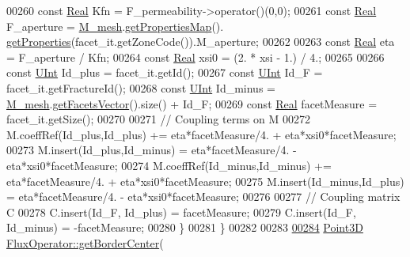 \begin{DoxyCode}
00260         \textcolor{keyword}{const} \hyperlink{namespaceFVCode3D_a40c1f5588a248569d80aa5f867080e83}{Real} Kfn = F\_permeability->operator()(0,0);
00261         \textcolor{keyword}{const} \hyperlink{namespaceFVCode3D_a40c1f5588a248569d80aa5f867080e83}{Real} F\_aperture = \hyperlink{classFVCode3D_1_1global__Operator_a027911d0f801f6f19a3006329ec30a7f}{M\_mesh}.\hyperlink{classFVCode3D_1_1Rigid__Mesh_ab6e52fa6193e5db83fe7ccbb1c3737e8}{getPropertiesMap}().
      \hyperlink{classFVCode3D_1_1PropertiesMap_ace888d15c9a4ab13d5e217a3a565604c}{getProperties}(facet\_it.getZoneCode()).M\_aperture;
00262         
00263                 \textcolor{keyword}{const} \hyperlink{namespaceFVCode3D_a40c1f5588a248569d80aa5f867080e83}{Real} eta          = F\_aperture / Kfn;
00264                 \textcolor{keyword}{const} \hyperlink{namespaceFVCode3D_a40c1f5588a248569d80aa5f867080e83}{Real} xsi0     =  (2. * xsi - 1.) / 4.;
00265                 
00266                 \textcolor{keyword}{const} \hyperlink{namespaceFVCode3D_a4bf7e328c75d0fd504050d040ebe9eda}{UInt} Id\_plus         = facet\_it.getId();
00267                 \textcolor{keyword}{const} \hyperlink{namespaceFVCode3D_a4bf7e328c75d0fd504050d040ebe9eda}{UInt} Id\_F            = facet\_it.getFractureId();
00268                 \textcolor{keyword}{const} \hyperlink{namespaceFVCode3D_a4bf7e328c75d0fd504050d040ebe9eda}{UInt} Id\_minus        = \hyperlink{classFVCode3D_1_1global__Operator_a027911d0f801f6f19a3006329ec30a7f}{M\_mesh}.\hyperlink{classFVCode3D_1_1Rigid__Mesh_a6d3cdd4ef8a5225599953179d5302636}{getFacetsVector}().size() + 
      Id\_F;
00269                 \textcolor{keyword}{const} \hyperlink{namespaceFVCode3D_a40c1f5588a248569d80aa5f867080e83}{Real} facetMeasure    = facet\_it.getSize();
00270                 
00271                 \textcolor{comment}{// Coupling terms on M}
00272                 M.coeffRef(Id\_plus,Id\_plus)    +=   eta*facetMeasure/4. + eta*xsi0*facetMeasure;
00273                 M.insert(Id\_plus,Id\_minus)      =   eta*facetMeasure/4. - eta*xsi0*facetMeasure;
00274                 M.coeffRef(Id\_minus,Id\_minus)  +=   eta*facetMeasure/4. + eta*xsi0*facetMeasure;
00275                 M.insert(Id\_minus,Id\_plus)      =   eta*facetMeasure/4. - eta*xsi0*facetMeasure;
00276                 
00277                 \textcolor{comment}{// Coupling matrix C}
00278                 C.insert(Id\_F, Id\_plus)     =  facetMeasure;
00279                 C.insert(Id\_F, Id\_minus)    = -facetMeasure;
00280         \}
00281 \}
00282 
00283 
\hypertarget{global__operator_8cpp_source.tex_l00284}{}\hyperlink{classFVCode3D_1_1FluxOperator_a9283ea5110f59751e1a8ea2c0b5da134}{00284} \hyperlink{classFVCode3D_1_1Point3D}{Point3D} \hyperlink{classFVCode3D_1_1FluxOperator_a9283ea5110f59751e1a8ea2c0b5da134}{FluxOperator::getBorderCenter}(

\end{DoxyCode}
